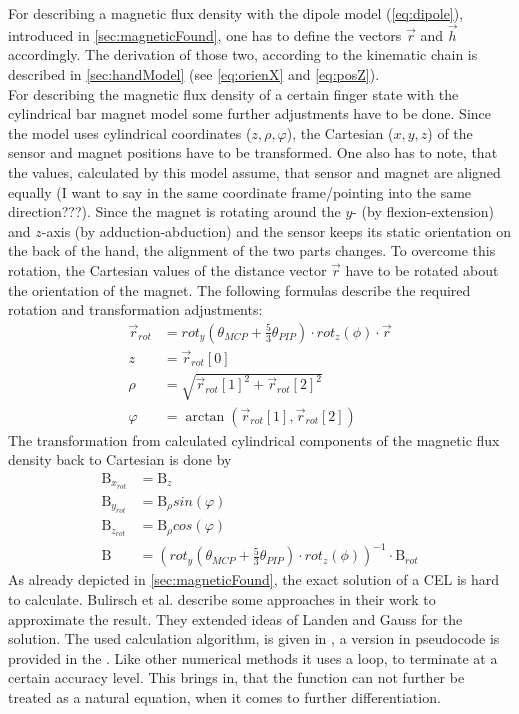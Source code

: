 For describing a magnetic flux density with the dipole model (\ref{eq:dipole}), introduced in \ref{sec:magneticFound}, one has to define the vectors $ \vec{r} $ and $ \vec{h} $ accordingly. The derivation of those two, according to the kinematic chain is described in \ref{sec:handModel} (see \ref{eq:orienX} and \ref{eq:posZ}).\\ 
For describing the magnetic flux density of a certain finger state with the cylindrical bar magnet model some further adjustments have to be done. Since the model uses cylindrical coordinates ($ z, \rho, \varphi $), the Cartesian ($ x, y, z $) of the sensor and magnet positions have to be transformed. One also has to note, that the values, calculated by this model assume, that sensor and magnet are aligned equally (I want to say in the same coordinate frame/pointing into the same direction???). Since the magnet is rotating around the $ y $- (by flexion-extension) and $ z $-axis (by adduction-abduction) and the sensor keeps its static orientation on the back of the hand, the alignment of the two parts changes. To overcome this rotation, the Cartesian values of the distance vector $ \vec{r} $ have to be rotated about the orientation of the magnet. The following formulas describe the required rotation and transformation adjustments:
\begin{equation}
\begin{aligned}
\vec{r}_{rot} &= rot_{y}(\theta_{MCP} + \frac{5}{3} \theta_{PIP}) \cdot rot_{z}(\phi) \cdot \vec{r}\\[3pt]
z &= \vec{r}_{rot}[0]\\
\rho &= \sqrt{\vec{r}_{rot}[1]^{2} + \vec{r}_{rot}[2]^2}\\
\varphi &= \arctan(\vec{r}_{rot}[1], \vec{r}_{rot}[2])
\end{aligned}
\end{equation}
The transformation from calculated cylindrical components of the magnetic flux density back to Cartesian is done by
\begin{equation}
\begin{aligned}
\mathrm{B}_{x_{rot}} &= \mathrm{B}_{z}\\
\mathrm{B}_{y_{rot}} &= \mathrm{B}_{\rho}sin(\varphi)\\
\mathrm{B}_{z_{rot}} &= \mathrm{B}_{\rho}cos(\varphi)\\[3pt]
\mathrm{B} &= (rot_{y}(\theta_{MCP} + \frac{5}{3} \theta_{PIP}) \cdot rot_{z}(\phi))^{-1} \cdot \mathrm{B}_{rot}
\end{aligned}
\end{equation}
As already depicted in \ref{sec:magneticFound}, the exact solution of a \ac{CEL} is hard to calculate. Bulirsch et al. \cite{bulirsch1965numerical} describe some approaches in their work to approximate the result. They extended ideas of Landen and Gauss for the solution. The used calculation algorithm, is given in \cite{derby2010cylindrical}, a version in pseudocode is provided in the . Like other numerical methods it uses a loop, to terminate at a certain accuracy level. This brings in, that the function can not further be treated as a natural equation, when it comes to further differentiation.



